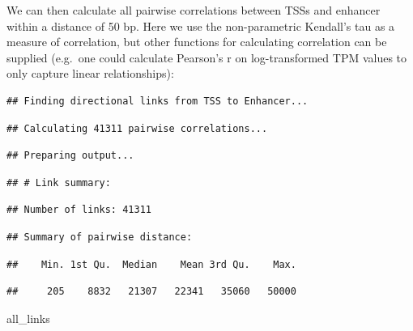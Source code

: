 \documentclass[9pt,a4paper,]{extarticle}
\newenvironment{Shaded}{\begin{snugshade}}{\end{snugshade}}
\newcommand{\KeywordTok}[1]{\textcolor[rgb]{0.13,0.29,0.53}{\textbf{{#1}}}}
\newcommand{\DataTypeTok}[1]{\textcolor[rgb]{0.13,0.29,0.53}{{#1}}}
\newcommand{\StringTok}[1]{\textcolor[rgb]{0.31,0.60,0.02}{{#1}}}
\newcommand{\NormalTok}[1]{{#1}}
\begin{document}
We can then calculate all pairwise correlations between TSSs and enhancer within a distance of 50 bp. Here we use the non-parametric Kendall's tau as a measure of correlation, but other functions for calculating correlation can be supplied (e.g.~one could calculate Pearson's r on log-transformed TPM values to only capture linear relationships):

\begin{Shaded}
\end{Shaded}

\begin{verbatim}
## Finding directional links from TSS to Enhancer...
\end{verbatim}

\begin{verbatim}
## Calculating 41311 pairwise correlations...
\end{verbatim}

\begin{verbatim}
## Preparing output...
\end{verbatim}

\begin{verbatim}
## # Link summary:
\end{verbatim}

\begin{verbatim}
## Number of links: 41311
\end{verbatim}

\begin{verbatim}
## Summary of pairwise distance:
\end{verbatim}

\begin{verbatim}
##    Min. 1st Qu.  Median    Mean 3rd Qu.    Max.
\end{verbatim}

\begin{verbatim}
##     205    8832   21307   22341   35060   50000
\end{verbatim}

\begin{Shaded}
\begin{Highlighting}[]
\NormalTok{all_links}
\end{Highlighting}
\end{Shaded}
\end{document}
